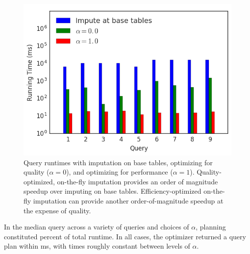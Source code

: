 \begin{figure}
\includegraphics[width=\columnwidth]{figures/running_times_combined_bar.png}
\caption{Query runtimes with imputation on base tables, \ProjectName{}
    optimizing for quality ($\alpha=0$), and \ProjectName{} optimizing for
    performance ($\alpha=1$). Quality-optimized, on-the-fly imputation provides an order of
    magnitude speedup over imputing on base tables. Efficiency-optimized on-the-fly
    imputation can provide another order-of-magnitude speedup at the expense of quality.}
    
\label{fig:runtimes}
\end{figure}


In the median query across a variety of queries and choices of $\alpha$, planning
constituted \planningruntimepercent{} percent of total runtime. In all cases, the optimizer
returned a query plan within \planningmaxtime{} ms, with times roughly constant between levels of $\alpha$.



